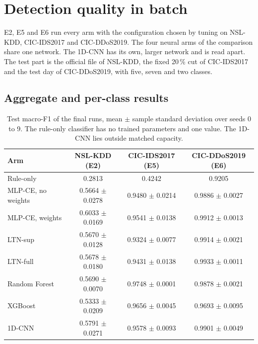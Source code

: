\section{Detection quality in batch}
\label{sec:res-detection}

E2, E5 and E6 run every arm with the configuration chosen by tuning on NSL-KDD, CIC-IDS2017 and
CIC-DDoS2019. The four neural arms of the comparison share one network. The 1D-CNN has its own, larger
network and is read apart. The test part is the official file of NSL-KDD, the fixed
20\,\% cut of CIC-IDS2017 and the test day of CIC-DDoS2019, with five, seven and two classes.

\subsection{Aggregate and per-class results}
\label{sec:res-aggregate}

\begin{table}[t]
\centering
\footnotesize
\caption{Test macro-F1 of the final runs, mean $\pm$ sample standard deviation over seeds 0 to 9.
The rule-only classifier has no trained parameters and one value. The 1D-CNN lies outside matched
capacity.}
\label{tab:res-macro-f1}
\setlength{\tabcolsep}{4pt}
\begin{tabular}{@{}lccc@{}}
\toprule
Arm & NSL-KDD (E2) & CIC-IDS2017 (E5) & CIC-DDoS2019 (E6) \\
\midrule
Rule-only          & 0.2813 & 0.4242 & 0.9205 \\
MLP-CE, no weights & 0.5664 $\pm$ 0.0278 & 0.9480 $\pm$ 0.0214 & 0.9886 $\pm$ 0.0027 \\
MLP-CE, weights    & 0.6033 $\pm$ 0.0169 & 0.9541 $\pm$ 0.0138 & 0.9912 $\pm$ 0.0013 \\
LTN-sup            & 0.5670 $\pm$ 0.0128 & 0.9324 $\pm$ 0.0077 & 0.9914 $\pm$ 0.0021 \\
LTN-full           & 0.5678 $\pm$ 0.0180 & 0.9431 $\pm$ 0.0138 & 0.9933 $\pm$ 0.0011 \\
Random Forest      & 0.5690 $\pm$ 0.0070 & 0.9748 $\pm$ 0.0001 & 0.9878 $\pm$ 0.0021 \\
XGBoost            & 0.5333 $\pm$ 0.0209 & 0.9656 $\pm$ 0.0045 & 0.9693 $\pm$ 0.0095 \\
\midrule
1D-CNN             & 0.5791 $\pm$ 0.0271 & 0.9578 $\pm$ 0.0093 & 0.9901 $\pm$ 0.0049 \\
\bottomrule
\end{tabular}
\end{table}


